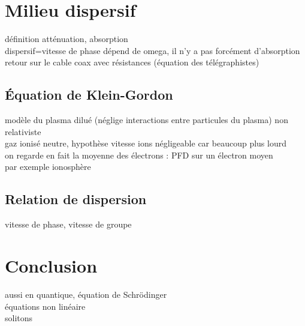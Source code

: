 \section{Milieu dispersif}
définition atténuation, absorption \\
dispersif=vitesse de phase dépend de omega, il n'y a pas forcément d'absorption \\
retour sur le cable coax avec résistances (équation des télégraphistes)  \\

\subsection{Équation de Klein-Gordon}

modèle du plasma dilué (néglige interactions entre particules du plasma) non relativiste \\
gaz ionisé neutre, hypothèse vitesse ions négligeable car beaucoup plus lourd \\
on regarde en fait la moyenne des électrons : PFD sur un électron moyen \\
par exemple ionosphère \\

\subsection{Relation de dispersion}
vitesse de phase, vitesse de groupe \\

\section*{Conclusion}
aussi en quantique, équation de Schrödinger \\
équations non linéaire \\
solitons \\



